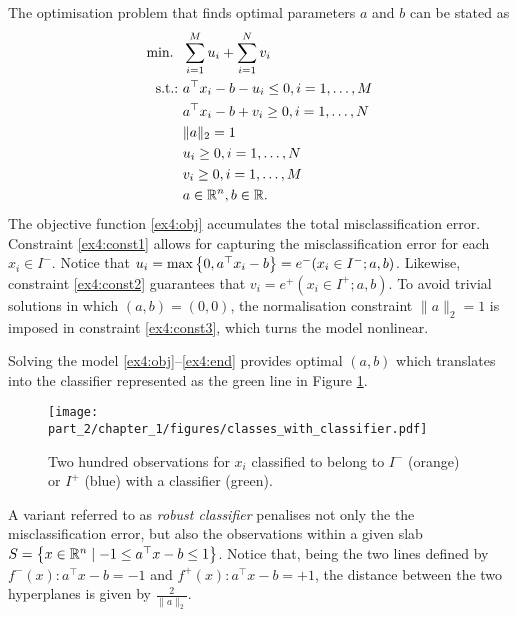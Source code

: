The optimisation problem that finds optimal parameters $a$ and $b$ can be stated as
%
\begin{align}
	\mathop{\text{min.~}} \ & \sum_{i=1}^M u_i + \sum_{i=1}^N v_i \label{ex4:obj}\\
	\mathop{\text{s.t.:~}} & a^\top x_i - b - u_i \leq 0, i = 1, \dots, M \label{ex4:const1} \\
    & a^\top x_i - b + v_i \geq 0, i = 1,\dots,N \label{ex4:const2} \\
    & \|a\|_2 = 1 \label{ex4:const3} \\
    & u_i \geq 0, i = 1, \dots, N \\
    & v_i \geq 0, i = 1, \dots, M \\
    & a \in \mathbb{R}^n, b \in \mathbb{R}. \label{ex4:end}   
\end{align} 
%
The objective function \eqref{ex4:obj} accumulates the total misclassification error. Constraint \eqref{ex4:const1} allows for capturing the misclassification error for each $x_i \in I^-$. Notice that $u_i = \max\left\{ 0, a^\top x_i -b \right \} = e^-(x_i \in I^-; a, b)$. Likewise, constraint \eqref{ex4:const2} guarantees that $v_i = e^+(x_i \in I^+; a, b)$.
To avoid trivial solutions in which $(a,b) = (0, 0)$, the normalisation constraint $\| a \|_2 = 1$ is imposed in constraint \eqref{ex4:const3}, which turns the model nonlinear.

Solving the model \eqref{ex4:obj}--\eqref{ex4:end} provides optimal $(a,b)$ which translates into the classifier represented as the green line in Figure \ref{fig:observations_with_classifier}.

\begin{figure}[h]
    \texttt{[image: part\_2/chapter\_1/figures/classes\_with\_classifier.pdf]}
    \caption{Two hundred observations for $x_i$ classified to belong to $I^-$ (orange) or $I^+$ (blue) with a classifier (green).}        
    \label{fig:observations_with_classifier}
\end{figure}
 
A variant referred to as \emph{robust classifier} penalises not only the the misclassification error, but also the observations within a given slab $S = \left\{ x \in \mathbb{R}^n \mid -1 \leq a^\top x - b \leq 1 \right \}$. Notice that, being the two lines defined by $f^-(x) : a^\top x - b = -1$ and $f^+(x) : a^\top x - b = +1$, the distance between the two hyperplanes is given by $\frac{2}{\|a\|_2}$. 


